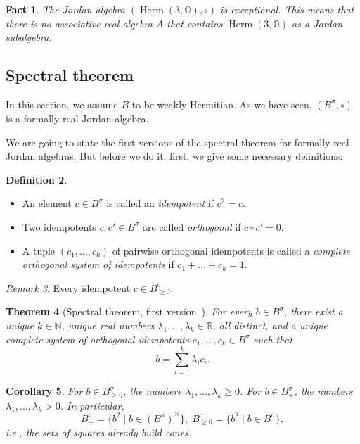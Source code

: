 \documentclass[a4paper,oneside,11pt]{amsart}
\DeclareMathOperator{\Herm}{Herm}
\newcommand{\R}{\mathbb R}
\newcommand{\N}{\mathbb N}
\newcommand{\Oc}{\mathbb O}
\theoremstyle{plain}
\newtheorem{teo}{Theorem}[section]
\newtheorem{cor}[teo]{Corollary}
\newtheorem{fact}[teo]{Fact}
\theoremstyle{definition}
\newtheorem{df}[teo]{Definition}
\theoremstyle{remark}
\newtheorem{rem}[teo]{Remark}
\newcommand{\defin}{\emph}
\begin{document}
\begin{fact}{\rm \cite[Corollary~2.8.5]{Hanche84}}
The Jordan algebra $(\Herm(3,\Oc),\circ)$ is exceptional. This means that there is no associative real algebra $A$ that contains $\Herm(3,\Oc)$ as a Jordan subalgebra.
\end{fact}


\subsection{Spectral theorem}

In this section, we assume $B$ to be weakly Hermitian. As we have seen, $(B^{\sigma},\circ)$ is a formally real Jordan algebra.

We are going to state the first versions of the spectral theorem for formally real Jordan algebras. But before we do it, first, we give some necessary definitions:

\begin{df}\begin{itemize}
\item An element $c\in B^{\sigma}$ is called an \defin{idempotent} if $c^2=c$.
\item Two idempotents $c,c'\in B^{\sigma}$ are called \defin{orthogonal} if $c\circ c'=0$.
\item A tuple $(c_1,\dots,c_k)$ of pairwise orthogonal idempotents is called a \defin{complete orthogonal system of idempotents} if $c_1+\dots+c_k=1$.
\end{itemize}
\end{df}

\begin{rem}
Every idempotent $c\in B^{\sigma}_{\geq 0}$.
\end{rem}

\begin{teo}[Spectral theorem, first version~{\cite[Theorem~III.1.1]{Faraut}}]\label{Spec_teo_B1}
For every $b\in B^{\sigma}$, there exist a unique $k\in\N$, unique real numbers $\lambda_1,\dots,\lambda_k\in\R$, all distinct, and a unique complete system of orthogonal idempotents $c_1,\dots,c_k\in B^{\sigma}$ such that
$$b=\sum_{i=1}^k\lambda_ic_i.$$
\end{teo}

\begin{cor}\label{theta_Bsym+}
For $b\in B^{\sigma}_{\geq 0}$, the numbers $\lambda_1,\dots,\lambda_k\geq 0$. For $b\in B^{\sigma}_+$, the numbers $\lambda_1,\dots,\lambda_k > 0$. In particular,
$$B^{\sigma}_+=\{b^2\mid b\in (B^\sigma)^\times\}
,\; B^{\sigma}_{\geq 0}=\{b^2\mid b\in B^\sigma\},$$
i.e., the sets of squares already build cones.
\end{cor}
\end{document}
